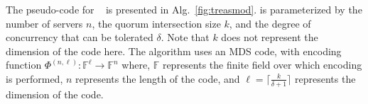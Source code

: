 The pseudo-code for  ~\treasmod{} is presented in  Alg.~\ref{fig:treasmod}. 
%
\treasmod{} is parameterized by the number of servers $n$, the quorum intersection size $k$, and the degree of concurrency that can be tolerated $\delta$. Note that $k$ does not represent the dimension of the code here. 
%
The algorithm uses an MDS code, with encoding function $\Phi^{(n,\ell)}: \mathbb{F}^{\ell} \rightarrow \mathbb{F}^{n}$ where, $\mathbb{F}$ represents the finite field over which encoding is performed, $n$ represents the length of the code, and $\ell = {\lceil \frac{k}{\delta+1} \rceil} $ represents the dimension of the code. 

